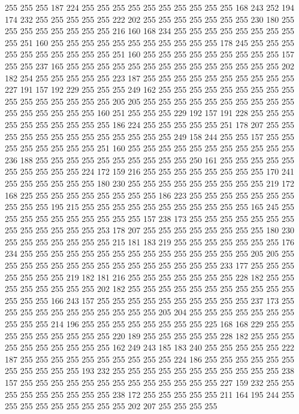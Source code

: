 255 255 255 187 224 255 255 255 255 255 255 255 255 255 255 168 243 252 194 174
232 255 255 255 255 255 222 202 255 255 255 255 255 255 255 230 180 255 255 255
255 255 255 255 255 216 160 168 234 255 255 255 255 255 255 255 255 255 251 160
255 255 255 255 255 255 255 255 255 255 255 178 245 255 255 255 255 255 255 255
255 255 255 251 160 255 255 255 255 255 255 255 255 255 157 255 255 237 165 255
255 255 255 255 255 255 255 255 255 255 255 255 255 202 182 254 255 255 255 255
255 223 187 255 255 255 255 255 255 255 255 255 255 227 191 157 192 229 255 255
255 249 162 255 255 255 255 255 255 255 255 255 255 255 255 255 255 255 255 205
205 255 255 255 255 255 255 255 255 255 255 255 255 255 255 255 255 160 251 255
255 255 229 192 157 191 228 255 255 255 255 255 255 255 255 255 255 186 224 255
255 255 255 255 251 178 207 255 255 255 255 255 255 255 255 255 255 255 255 255
249 158 244 255 255 157 255 255 255 255 255 255 255 255 251 160 255 255 255 255
255 255 255 255 255 255 255 236 188 255 255 255 255 255 255 255 255 255 255 250
161 255 255 255 255 255 255 255 255 255 255 224 172 159 216 255 255 255 255 255
255 255 255 170 241 255 255 255 255 255 255 180 230 255 255 255 255 255 255 255
255 255 219 172 168 225 255 255 255 255 255 255 255 255 186 223 255 255 255 255
255 255 255 255 255 255 195 215 255 255 255 255 255 255 255 255 255 255 255 165
245 255 255 255 255 255 255 255 255 255 255 157 238 173 255 255 255 255 255 255
255 255 255 255 255 255 255 253 178 207 255 255 255 255 255 255 255 255 180 230
255 255 255 255 255 255 255 215 181 183 219 255 255 255 255 255 255 255 176 234
255 255 255 255 255 255 255 255 255 255 255 255 255 255 255 205 205 255 255 255
255 255 255 255 255 255 255 255 255 255 255 255 233 177 255 255 255 255 255 255
255 219 182 181 216 255 255 255 255 255 255 255 228 182 255 255 255 255 255 255
255 255 202 182 255 255 255 255 255 255 255 255 255 255 255 255 255 255 166 243
157 255 255 255 255 255 255 255 255 255 255 237 173 255 255 255 255 255 255 255
255 255 255 255 205 204 255 255 255 255 255 255 255 255 255 255 214 196 255 255
255 255 255 255 255 255 225 168 168 229 255 255 255 255 255 255 255 255 255 220
189 255 255 255 255 255 228 182 255 255 255 255 255 255 255 255 255 255 162 249
243 185 183 240 255 255 255 255 255 222 187 255 255 255 255 255 255 255 255 255
255 224 186 255 255 255 255 255 255 255 255 255 255 255 193 232 255 255 255 255
255 255 255 255 255 255 255 238 157 255 255 255 255 255 255 255 255 255 255 255
255 255 227 159 232 255 255 255 255 255 255 255 255 255 238 172 255 255 255 255
255 211 164 195 244 255 255 255 255 255 255 255 255 255 202 207 255 255 255 255
